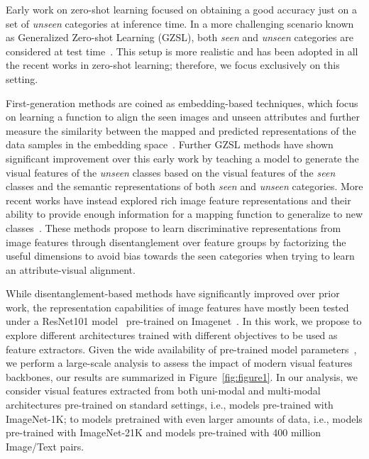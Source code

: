Early work on zero-shot learning focused on obtaining a good accuracy just on a set of {\em unseen} categories at inference time. In a more challenging scenario known as Generalized Zero-shot Learning (GZSL), both {\em seen} and {\em unseen} categories are considered at test time~\cite{Chao2016AnES, Pourpanah2020ARO}. This setup is more realistic and has been adopted in all the recent works in zero-shot learning; therefore, we focus exclusively on this setting.

First-generation methods are coined as embedding-based techniques, which focus on learning a function to align the seen images and unseen attributes and further measure the similarity between the mapped and predicted representations of the data samples in the embedding space~\cite{ESZSL, ALE, Zhang2017LearningAD, Zhang2020TowardsED}.
Further GZSL methods have shown significant improvement over this early work by teaching a model to generate the visual features of the {\em unseen} classes based on the visual features of the {\em seen} classes and the semantic representations of both {\em seen} and {\em unseen} categories. 
More recent works have instead explored rich image feature representations and their ability to provide enough information for a mapping function to generalize to new classes~\cite{Tong2019HierarchicalDO, SDGZSL}. 
These methods propose to learn discriminative representations from image features through disentanglement over feature groups by factorizing the useful dimensions to avoid bias towards the seen categories when trying to learn an attribute-visual alignment.

While disentanglement-based methods have significantly improved over prior work,
the representation capabilities of image features have mostly been tested under a ResNet101 model~\cite{RNs} pre-trained on Imagenet~\cite{AWA2, Liu2018GeneralizedZL}. 
In this work, we propose to explore different architectures trained with different objectives to be used as feature extractors. Given the wide availability of pre-trained model parameters~\cite{Gavrikov2022CNNFD, timm, Croce2021RobustBenchAS}, we perform a large-scale analysis to assess the impact of modern visual features backbones, our results are summarized in Figure~\ref{fig:figure1}. 
In our analysis, we consider visual features extracted from both uni-modal and multi-modal architectures pre-trained on standard settings, i.e., models pre-trained with ImageNet-1K; to models pretrained with even larger amounts of data, i.e., models pre-trained with ImageNet-21K and models pre-trained with 400 million Image/Text pairs.


